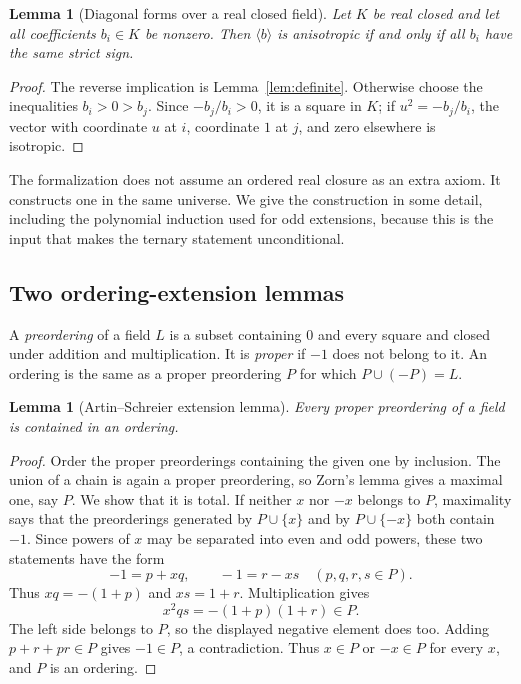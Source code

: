 \documentclass[uplatex,dvipdfmx]{jsarticle}
\newtheorem{lemma}[theorem]{Lemma}
\theoremstyle{definition}
\theoremstyle{remark}
\begin{document}
\begin{lemma}[Diagonal forms over a real closed field]\label{lem:rcdiag}
Let $K$ be real closed and let all coefficients $b_i\in K$ be nonzero.
Then $\langle b\rangle$ is anisotropic if and only if all $b_i$ have the
same strict sign.
\end{lemma}
\begin{proof}
The reverse implication is Lemma~\ref{lem:definite}.  Otherwise choose
the inequalities $b_i>0>b_j$.  Since $-b_j/b_i>0$, it is a square in $K$; if
$u^2=-b_j/b_i$, the vector with coordinate $u$ at $i$, coordinate $1$ at $j$,
and zero elsewhere is isotropic.
\end{proof}

The formalization does not assume an ordered real closure as an extra axiom.
It constructs one in the same universe.  We give the construction in some
detail, including the polynomial induction used for odd extensions, because
this is the input that makes the ternary statement unconditional.

\subsection{Two ordering-extension lemmas}

A \emph{preordering} of a field $L$ is a subset containing $0$ and every
square and closed under addition and multiplication.  It is \emph{proper} if
$-1$ does not belong to it.  An ordering is the same as a proper preordering
$P$ for which $P\cup(-P)=L$.

\begin{lemma}[Artin--Schreier extension lemma]\label{lem:preorder-extension}
Every proper preordering of a field is contained in an ordering.
\end{lemma}
\begin{proof}
Order the proper preorderings containing the given one by inclusion.  The
union of a chain is again a proper preordering, so Zorn's lemma gives a maximal
one, say $P$.  We show that it is total.  If neither $x$ nor $-x$ belongs to
$P$, maximality says that the preorderings generated by $P\cup\{x\}$ and by
$P\cup\{-x\}$ both contain $-1$.  Since powers of $x$ may be separated into
even and odd powers, these two statements have the form
\[
  -1=p+xq,\qquad -1=r-xs
  \quad(p,q,r,s\in P).
\]
Thus $xq=-(1+p)$ and $xs=1+r$.  Multiplication gives
\[
  x^2qs=-(1+p)(1+r)\in P.
\]
The left side belongs to $P$, so the displayed negative element does too.
Adding $p+r+pr\in P$ gives $-1\in P$, a contradiction.
Thus $x\in P$ or $-x\in P$ for every $x$, and $P$ is an ordering.
\end{proof}
\end{document}
